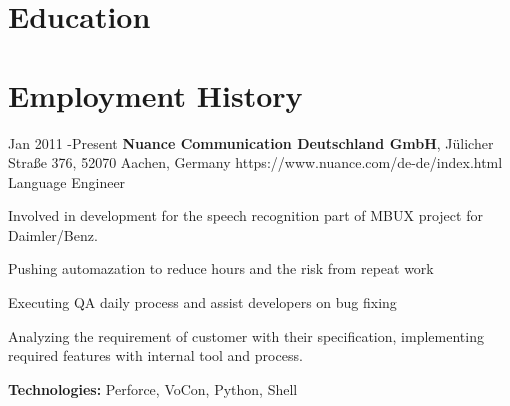 \documentclass[10pt]{article} %
\begin{document}

\section{Education}





\section{Employment History}

\job
{Jan 2011 -}{Present}
{{\bf Nuance Communication Deutschland GmbH}, J\"ulicher Stra{\ss}e 376, 52070 Aachen, Germany}
{https://www.nuance.com/de-de/index.html}
{Language Engineer}
{Involved in development for the speech recognition part of MBUX project for Daimler/Benz.
\begin{itemize-noindent}
	\item{Pushing automazation to reduce hours and the risk from repeat work}
	\item{Executing QA daily process and assist developers on bug fixing}
	\item{Analyzing the requirement of customer with their specification, implementing required features with internal tool and process.}

\end{itemize-noindent}
\rule{0mm}{5mm}\textbf{Technologies:} Perforce, VoCon, Python, Shell}
\end{document}
